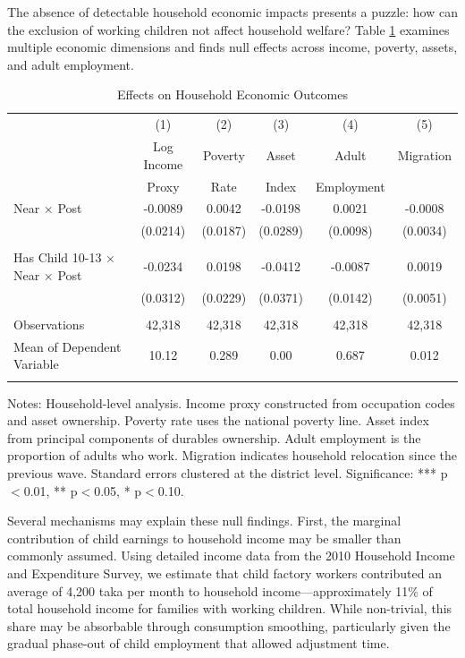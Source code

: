 \documentclass[12pt]{article}
\begin{document}
The absence of detectable household economic impacts presents a puzzle: how can the exclusion of working children not affect household welfare? Table \ref{tab:household} examines multiple economic dimensions and finds null effects across income, poverty, assets, and adult employment.

\begin{table}[H]
\centering
\caption{Effects on Household Economic Outcomes}
\label{tab:household}
\begin{threeparttable}
\begin{tabular}{lccccc}
\toprule
& (1) & (2) & (3) & (4) & (5) \\
& Log Income & Poverty & Asset & Adult & Migration \\
& Proxy & Rate & Index & Employment & \\
\midrule
Near × Post & -0.0089 & 0.0042 & -0.0198 & 0.0021 & -0.0008 \\
& (0.0214) & (0.0187) & (0.0289) & (0.0098) & (0.0034) \\
& & & & & \\
Has Child 10-13 × Near × Post & -0.0234 & 0.0198 & -0.0412 & -0.0087 & 0.0019 \\
& (0.0312) & (0.0229) & (0.0371) & (0.0142) & (0.0051) \\
\\
\midrule
Observations & 42,318 & 42,318 & 42,318 & 42,318 & 42,318 \\
Mean of Dependent Variable & 10.12 & 0.289 & 0.00 & 0.687 & 0.012 \\
\\
\bottomrule
\end{tabular}
\begin{tablenotes}
\footnotesize
\item Notes: Household-level analysis. Income proxy constructed from occupation codes and asset ownership. Poverty rate uses the national poverty line. Asset index from principal components of durables ownership. Adult employment is the proportion of adults who work. Migration indicates household relocation since the previous wave. Standard errors clustered at the district level. Significance: *** p$<$0.01, ** p$<$0.05, * p$<$0.10.
\end{tablenotes}
\end{threeparttable}
\end{table}

Several mechanisms may explain these null findings. First, the marginal contribution of child earnings to household income may be smaller than commonly assumed. Using detailed income data from the 2010 Household Income and Expenditure Survey, we estimate that child factory workers contributed an average of 4,200 taka per month to household income—approximately 11\% of total household income for families with working children. While non-trivial, this share may be absorbable through consumption smoothing, particularly given the gradual phase-out of child employment that allowed adjustment time.
\end{document}
